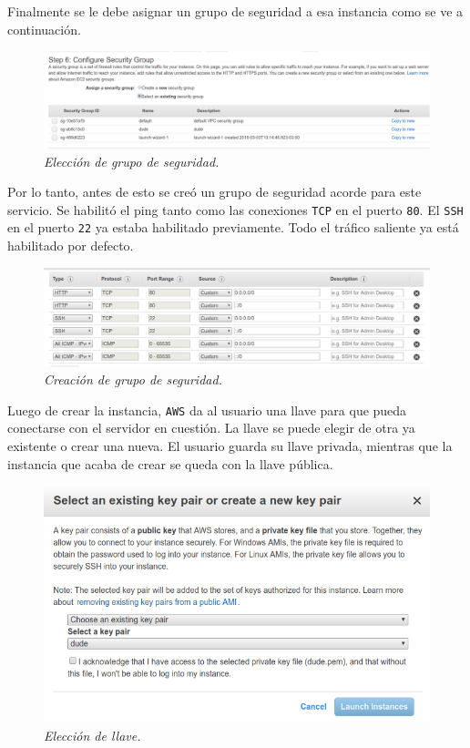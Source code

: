Finalmente se le debe asignar un grupo de seguridad a esa instancia como se ve a continuación. 

\begin{figure}[H]
  \centering
  \includegraphics[width=\textwidth, keepaspectratio]{images/AWS3}
  \caption{\textit{Elección de grupo de seguridad.}}
  \label{fig:AWS3}
\end{figure}

Por lo tanto, antes de esto se creó un grupo de seguridad acorde para este servicio. Se habilitó el ping tanto como las conexiones \lstinline[columns=fixed]{TCP} en el puerto \lstinline[columns=fixed]{80}. El \lstinline[columns=fixed]{SSH} en el puerto \lstinline[columns=fixed]{22} ya estaba habilitado previamente. Todo el tráfico saliente ya está habilitado por defecto. 

\begin{figure}[H]
  \centering
  \includegraphics[width=\textwidth, keepaspectratio]{images/AWS4}
  \caption{\textit{Creación de grupo de seguridad.}}
  \label{fig:AWS4}
\end{figure}

Luego de crear la instancia, \lstinline[columns=fixed]{AWS} da al usuario una llave para que pueda conectarse con el servidor en cuestión. La llave se puede elegir de otra ya existente o crear una nueva. El usuario guarda su llave privada, mientras que la instancia que acaba de crear se queda con la llave pública. 

\begin{figure}[H]
  \centering
  \includegraphics[width=\textwidth, keepaspectratio]{images/AWS5}
  \caption{\textit{Elección de llave.}}
  \label{fig:AWS5}
\end{figure}

